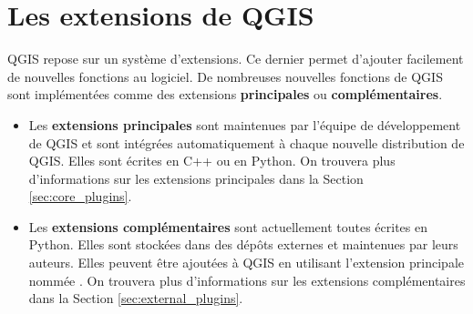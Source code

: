 

\section{Les extensions de QGIS}\label{sec:extensions}



QGIS repose sur un système d'extensions.
Ce dernier permet d'ajouter facilement de nouvelles fonctions au logiciel. 
De nombreuses nouvelles fonctions de QGIS sont implémentées comme des extensions \textbf{principales} ou \textbf{complémentaires}.  


\begin{itemize}
\item Les \textbf{extensions principales} sont maintenues par l'équipe de développement de QGIS et sont intégrées automatiquement à chaque nouvelle distribution de QGIS.
Elles sont écrites en C++ ou en Python.
On trouvera plus d'informations sur les extensions principales dans la Section \ref{sec:core_plugins}.
\item Les \textbf{extensions complémentaires} sont actuellement toutes écrites en Python.
Elles sont stockées dans des dépôts externes et maintenues par leurs auteurs.
Elles peuvent être ajoutées à QGIS en utilisant l'extension principale nommée .
On trouvera plus d'informations sur les extensions complémentaires dans la Section \ref{sec:external_plugins}.
\end{itemize}

